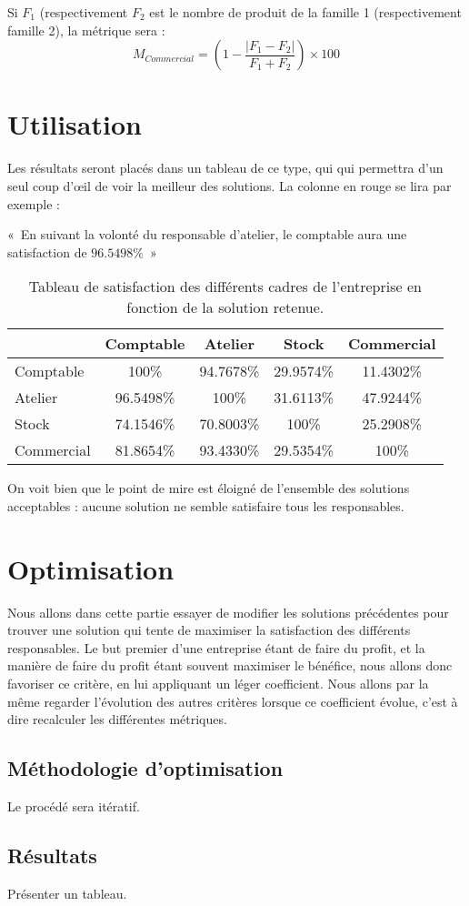 Si $F_1$ (respectivement $F_2$ est le nombre de produit de la famille 1
(respectivement famille 2), la métrique sera :
$$
M_{Commercial} = \left( 1 - \frac{|F_1 - F_2|}{F_1 + F_2} \right) \times 100
$$

\section{Utilisation}
Les résultats seront placés dans un tableau de ce type, qui qui permettra d'un
seul coup d'œil de voir la meilleur des solutions.
La colonne en rouge se lira par exemple : 
\begin{center}
«~En suivant la volonté du responsable d'atelier, le comptable aura une
satisfaction de $96.5498\%$~»
\end{center}

\begin{table}[!ht]
    \begin{center}
    \begin{tabular}{|l|c|c|c|c|}
\hline
\cellcolor[gray]{0.9} & Comptable& Atelier & Stock & Commercial  \\
\hline
Comptable & \cellcolor[gray]{0.9} 100\% & 94.7678\% & 29.9574\% & 11.4302\% \\
\hline
Atelier & \cellcolor{red} 96.5498\% & \cellcolor[gray]{0.9} 100\% & 31.6113\% & 47.9244\% \\
\hline
Stock &  74.1546\% & 70.8003\% & \cellcolor[gray]{0.9} 100\% &
25.2908\% \\
\hline
Commercial & 81.8654\% & 93.4330\% & 29.5354\% & \cellcolor[gray]{0.9} 100\% \\
\hline
    \end{tabular}
    \end{center}
    \caption{Tableau de satisfaction des différents cadres de l'entreprise en
	fonction de la solution retenue.}

On voit bien que le point de mire est éloigné de l'ensemble des solutions
acceptables : aucune solution ne semble satisfaire tous les responsables.
\end{table}

\section{Optimisation}
Nous allons dans cette partie essayer de modifier les solutions précédentes
pour trouver une solution qui tente de maximiser la satisfaction des différents
responsables.
Le but premier d'une entreprise étant de faire du profit, et la manière de
faire du profit étant souvent maximiser le bénéfice, nous allons donc favoriser
ce critère, en lui appliquant un léger coefficient.
Nous allons par la même regarder l'évolution des autres critères lorsque ce
coefficient évolue, c'est à dire recalculer les différentes métriques.

\subsection{Méthodologie d'optimisation}
Le procédé sera itératif.

\subsection{Résultats}
Présenter un tableau.
